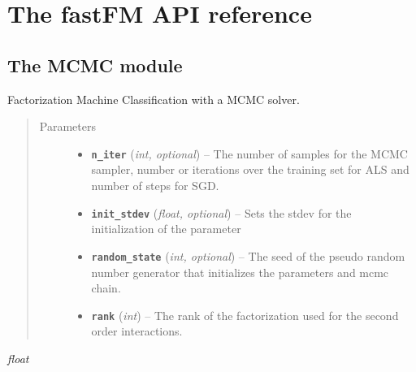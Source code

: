\documentclass[letterpaper,10pt,english]{sphinxmanual}
\begin{document}
\chapter{The fastFM API reference}
\label{api:the-fastfm-api-reference}\label{api::doc}

\section{The MCMC module}
\label{api:the-mcmc-module}\label{api:module-fastFM.mcmc}

\begin{fulllineitems}
\label{api:fastFM.mcmc.FMClassification}
Factorization Machine Classification with a MCMC solver.
\begin{quote}\begin{description}
\item[{Parameters}] \leavevmode\begin{itemize}
\item {} 
\textbf{\texttt{n\_iter}} (\emph{int, optional}) -- The number of samples for the MCMC sampler, number or iterations over
the training set for ALS and number of steps for SGD.

\item {} 
\textbf{\texttt{init\_stdev}} (\emph{float, optional}) -- Sets the stdev  for the initialization of the parameter

\item {} 
\textbf{\texttt{random\_state}} (\emph{int, optional}) -- The seed of the pseudo random number generator that
initializes the parameters and mcmc chain.

\item {} 
\textbf{\texttt{rank}} (\emph{int}) -- The rank of the factorization used for the second order interactions.

\end{itemize}

\end{description}\end{quote}

\begin{fulllineitems}
\label{api:fastFM.mcmc.FMClassification.w0_}
\emph{float}


\end{fulllineitems}
\end{fulllineitems}
\end{document}
